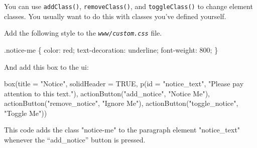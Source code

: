\documentclass[
  oneside]{book}
\newenvironment{Shaded}{\begin{snugshade}}{\end{snugshade}}
\newcommand{\AttributeTok}[1]{\textcolor[rgb]{0.77,0.63,0.00}{#1}}
\newcommand{\ConstantTok}[1]{\textcolor[rgb]{0.00,0.00,0.00}{#1}}
\newcommand{\DecValTok}[1]{\textcolor[rgb]{0.00,0.00,0.81}{#1}}
\newcommand{\FunctionTok}[1]{\textcolor[rgb]{0.00,0.00,0.00}{#1}}
\newcommand{\NormalTok}[1]{#1}
\newcommand{\SpecialCharTok}[1]{\textcolor[rgb]{0.00,0.00,0.00}{#1}}
\newcommand{\StringTok}[1]{\textcolor[rgb]{0.31,0.60,0.02}{#1}}
\begin{document}
You can use \texttt{addClass}\texttt{()}, \texttt{removeClass}\texttt{()}, and \texttt{toggleClass}\texttt{()} to change element classes. You usually want to do this with classes you've defined yourself.

Add the following style to the \textit{\texttt{www/custom.css}} file.

\begin{Shaded}
\begin{Highlighting}[]
\NormalTok{.notice}\SpecialCharTok{{-}}\NormalTok{me \{}
\NormalTok{  color}\SpecialCharTok{:}\NormalTok{ red;}
\NormalTok{  text}\SpecialCharTok{{-}}\NormalTok{decoration}\SpecialCharTok{:}\NormalTok{ underline;}
\NormalTok{  font}\SpecialCharTok{{-}}\NormalTok{weight}\SpecialCharTok{:} \DecValTok{800}\NormalTok{;}
\NormalTok{\}}
\end{Highlighting}
\end{Shaded}

And add this box to the ui:

\begin{Shaded}
\begin{Highlighting}[]
\FunctionTok{box}\NormalTok{(}\AttributeTok{title =} \StringTok{"Notice"}\NormalTok{, }\AttributeTok{solidHeader =} \ConstantTok{TRUE}\NormalTok{, }\FunctionTok{p}\NormalTok{(}\AttributeTok{id =} \StringTok{"notice\_text"}\NormalTok{, }\StringTok{"Please pay attention to this text."}\NormalTok{),}
    \FunctionTok{actionButton}\NormalTok{(}\StringTok{"add\_notice"}\NormalTok{, }\StringTok{"Notice Me"}\NormalTok{), }\FunctionTok{actionButton}\NormalTok{(}\StringTok{"remove\_notice"}\NormalTok{, }\StringTok{"Ignore Me"}\NormalTok{),}
    \FunctionTok{actionButton}\NormalTok{(}\StringTok{"toggle\_notice"}\NormalTok{, }\StringTok{"Toggle Me"}\NormalTok{))}
\end{Highlighting}
\end{Shaded}

This code adds the class \StringTok{"notice-me"} to the paragraph element \StringTok{"notice\_text"} whenever the ``add\_notice'' button is pressed.

\begin{Shaded}
\end{Shaded}
\end{document}
